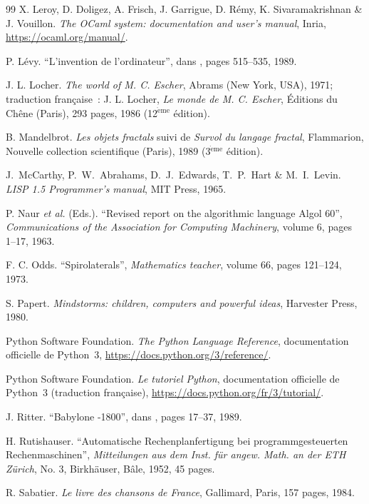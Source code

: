 \begin{thebibliography}{99}
 X. Leroy, D. Doligez, A. Frisch, J. Garrigue, D. Rémy, K. Sivaramakrishnan
\& J. Vouillon. {\em The OCaml system: documentation and user's manual}, Inria, 
\url{https://ocaml.org/manual/}.

 P. Lévy.
``L'invention de l'ordinateur'', \rm dans \cite{serres1}, pages 515--535, 1989.

 J. L. Locher.
{\em The world of M. C. Escher}, Abrams (New York, USA), 1971\/\/;
{\footnotesize traduction française~:} J. L. Locher,
{\em Le monde de M. C. Escher}, Éditions du Chêne (Paris), 
293 pages, 1986 (12$^{\mathrm{\grave{e}me}}$ édition).

 B. Mandelbrot.
{\em Les objets fractals} {\footnotesize suivi de} {\em Survol du langage
fractal}, Flammarion, Nouvelle collection scientifique (Paris), 1989
(3$^{\mathrm{\grave{e}me}}$ édition).

 J.~McCarthy, P.~W.~Abrahams, D.~J.~Edwards, T.~P.~Hart
\& M.~I.~Levin.
{\em LISP 1.5 Programmer's manual}, 
MIT Press, 1965.

 P. Naur {\em et al.}  (Eds.).
``Revised report on the algorithmic language Algol 60'', 
{\em Communications of the Association for Computing Machinery}, 
volume 6, pages 1--17, 1963.

 F. C. Odds.
``Spirolaterals'', {\em Mathematics teacher}, volume 66, pages 121--124, 1973.

 S. Papert.
{\em Mindstorms: children, computers and powerful ideas}, Harvester Press, 
1980.

 Python Software Foundation.
{\em The Python Language Reference}, documentation officielle de Python~3,
\url{https://docs.python.org/3/reference/}.

 Python Software Foundation.
{\em Le tutoriel Python}, documentation officielle de Python~3 (traduction française),
\url{https://docs.python.org/fr/3/tutorial/}.

 J. Ritter.
``Babylone -1800'', \rm dans \cite{serres1}, pages 17--37, 1989.

 H. Rutishauser.
``Automatische Rechenplanfertigung bei programmgesteuerten
Rechenmaschinen'', {\em Mitteilungen aus dem Inst. für angew. Math. an der ETH 
Zürich}, No. 3, Birkhäuser, Bâle, 1952, 45 pages.

 R. Sabatier.
{\em Le livre des chansons de France}, Gallimard, Paris, 157 pages, 1984.


\end{thebibliography}
